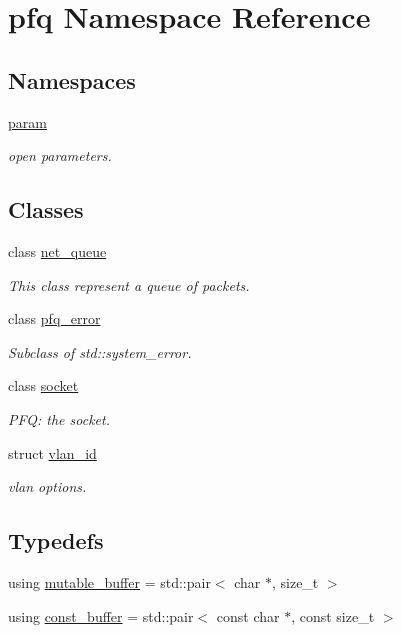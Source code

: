 \hypertarget{namespacepfq}{\section{pfq Namespace Reference}
\label{namespacepfq}
}
\subsection*{Namespaces}
\begin{DoxyCompactItemize}
\item 
 \hyperlink{namespacepfq_1_1param}{param}
\begin{DoxyCompactList}\small\item\em open parameters. \end{DoxyCompactList}\end{DoxyCompactItemize}
\subsection*{Classes}
\begin{DoxyCompactItemize}
\item 
class \hyperlink{classpfq_1_1net__queue}{net\+\_\+queue}
\begin{DoxyCompactList}\small\item\em This class represent a queue of packets. \end{DoxyCompactList}\item 
class \hyperlink{classpfq_1_1pfq__error}{pfq\+\_\+error}
\begin{DoxyCompactList}\small\item\em Subclass of std\+::system\+\_\+error. \end{DoxyCompactList}\item 
class \hyperlink{classpfq_1_1socket}{socket}
\begin{DoxyCompactList}\small\item\em P\+F\+Q\+: the socket. \end{DoxyCompactList}\item 
struct \hyperlink{structpfq_1_1vlan__id}{vlan\+\_\+id}
\begin{DoxyCompactList}\small\item\em vlan options. \end{DoxyCompactList}\end{DoxyCompactItemize}
\subsection*{Typedefs}
\begin{DoxyCompactItemize}
\item 
using \hyperlink{namespacepfq_ad7b88920eaf729154354741132483ea8}{mutable\+\_\+buffer} = std\+::pair$<$ char $\ast$, size\+\_\+t $>$
\item 
using \hyperlink{namespacepfq_ac835a1bd09b4cbaba61c100b50d0a99f}{const\+\_\+buffer} = std\+::pair$<$ const char $\ast$, const size\+\_\+t $>$
\end{DoxyCompactItemize}
